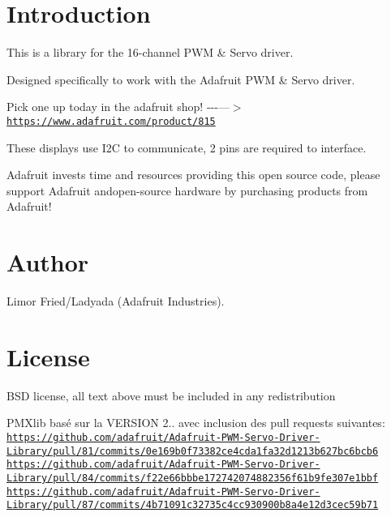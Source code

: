 \hypertarget{index_intro_sec}{}\section{Introduction}\label{index_intro_sec}
This is a library for the 16-\/channel P\+WM \& Servo driver.

Designed specifically to work with the Adafruit P\+WM \& Servo driver.

Pick one up today in the adafruit shop! -\/-\/-\/---$>$ \href{https://www.adafruit.com/product/815}{\tt https\+://www.\+adafruit.\+com/product/815}

These displays use I2C to communicate, 2 pins are required to interface.

Adafruit invests time and resources providing this open source code, please support Adafruit andopen-\/source hardware by purchasing products from Adafruit!\hypertarget{index_author}{}\section{Author}\label{index_author}
Limor Fried/\+Ladyada (Adafruit Industries).\hypertarget{index_license}{}\section{License}\label{index_license}
B\+SD license, all text above must be included in any redistribution

P\+M\+Xlib basé sur la V\+E\+R\+S\+I\+ON 2.. avec inclusion des pull requests suivantes\+: \href{https://github.com/adafruit/Adafruit-PWM-Servo-Driver-Library/pull/81/commits/0e169b0f73382ce4cda1fa32d1213b627bc6bcb6}{\tt https\+://github.\+com/adafruit/\+Adafruit-\/\+P\+W\+M-\/\+Servo-\/\+Driver-\/\+Library/pull/81/commits/0e169b0f73382ce4cda1fa32d1213b627bc6bcb6} \href{https://github.com/adafruit/Adafruit-PWM-Servo-Driver-Library/pull/84/commits/f22e66bbbe172742074882356f61b9fe307e1bbf}{\tt https\+://github.\+com/adafruit/\+Adafruit-\/\+P\+W\+M-\/\+Servo-\/\+Driver-\/\+Library/pull/84/commits/f22e66bbbe172742074882356f61b9fe307e1bbf} \href{https://github.com/adafruit/Adafruit-PWM-Servo-Driver-Library/pull/87/commits/4b71091c32735c4cc930900b8a4e12d3cec59b71}{\tt https\+://github.\+com/adafruit/\+Adafruit-\/\+P\+W\+M-\/\+Servo-\/\+Driver-\/\+Library/pull/87/commits/4b71091c32735c4cc930900b8a4e12d3cec59b71} 